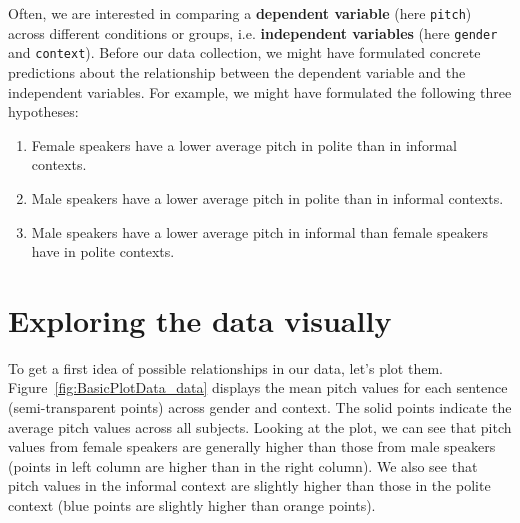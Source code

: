 \documentclass[nobib]{tufte-handout}
\begin{document}
Often, we are interested in comparing a \textbf{dependent variable} (here \texttt{pitch})
across different conditions or groups, i.e. \textbf{independent variables} (here \texttt{gender} and \texttt{context}). Before our data collection,
we might have formulated concrete predictions about the relationship between the dependent
variable and the independent variables. For example, we might have formulated the following three
hypotheses:

\begin{enumerate}[{H}1:]
\item Female speakers have a lower average pitch in polite than in informal contexts.
\item Male speakers have a lower average pitch in polite than in informal contexts.
\item Male speakers have a lower average pitch in informal than female speakers have in polite contexts.
\end{enumerate}

\section{Exploring the data visually}

To get a first idea of possible relationships in our data, let's plot
them. Figure~\ref{fig:BasicPlotData_data} displays the mean pitch values for each
sentence (semi-transparent points) across gender and context. The solid points indicate the
average pitch values across all subjects. Looking at the plot, we can see that pitch values
from female speakers are generally higher than those from male speakers (points in left column
are higher than in the right column). We also see that pitch values in the informal context are slightly higher than those in the polite context  (blue points are
slightly higher than orange points).
\end{document}
